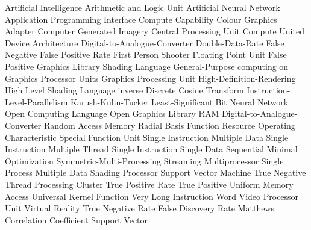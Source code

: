 

		{Artificial Intelligence	}
		{Arithmetic and Logic Unit}
		{Artificial Neural Network}
		{Application Programming Interface}
		{Compute Capability}
		{Colour Graphics Adapter}
		{Computer Generated Imagery}
		{Central Processing Unit}
		{Compute United Device Architecture}
		{Digital-to-Analogue-Converter}
		{Double-Data-Rate}
		{False Negative}
		{False Positive Rate}
		{First Person Shooter}
		{Floating Point Unit}
		{False Positive}
		{Graphics Library Shading Language}
	{General-Purpose computing on Graphics Processor Units}
		{Graphics Processing Unit}
		{High-Definition-Rendering}
		{High Level Shading Language}
		{inverse Discrete Cosine Transform}
		{Instruction-Level-Parallelism}
		{Karush-Kuhn-Tucker}
		{Least-Significant Bit}
		{Neural Network}
	{Open Computing Language}
	{Open Graphics Library}
	{RAM Digital-to-Analogue-Converter}
		{Random Access Memory}
		{Radial Basis Function}
		{Resource Operating Characteristic}
		{Special Function Unit}
		{Single Instruction Multiple Data}
		{Single Instruction Multiple Thread}
		{Single Instruction Single Data}
		{Sequential Minimal Optimization}
		{Symmetric-Multi-Processing}
		{Streaming Multiprocessor}
		{Single Process Multiple Data}
		{Shading Processor}
		{Support Vector Machine}
		{True Negative}
		{Thread Processing Cluster}
		{True Positive Rate}
		{True Positive}
		{Uniform Memory Access}
		{Universal Kernel Function}
		{Very Long Instruction Word}
		{Video Processor Unit}
		{Virtual Reality}
		{True Negative Rate}
		{False Discovery Rate}
		{Matthews Correlation Coefficient}
		{Support Vector}
